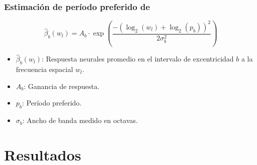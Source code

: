 \documentclass[
11pt, %
%
aspectratio=169, %
]{beamer}
\begin{document}
	

	\begin{frame}
		\frametitle{Estimaci\'on de per\'iodo preferido de \cite{broderick_mapping_2022}}
		
		
				\centering
				\begin{equation*}
					\hat{\beta}_b(w_l) = A_b \cdot \exp\left(\frac{-(\log_2(w_l) + \log_2(p_b))^2}{2\sigma_b^2}\right)					
				\end{equation*}	
				
				
		
				\begin{itemize} 			
					\item \(\hat{\beta}_b(w_l)\): Respuesta neurales promedio en el intervalo de excentricidad \(b\) a la frecuencia espacial \(w_l\).		
					\item \(A_b\): Ganancia de respuesta.
					\item \(p_b\): Per\'iodo preferido.
					\item \(\sigma_b\): Ancho de banda medido en octavas.
				\end{itemize}					
		
				
	\end{frame}
	
	\section{Resultados}
	
\end{document}
